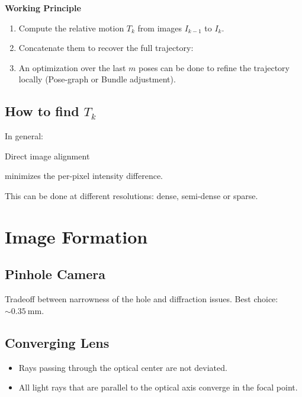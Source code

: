 \documentclass[10pt,a4paper]{scrartcl}
\begin{document}
\begin{multicols*}{2}
\textbf{Working Principle}

\begin{enumerate}
\item Compute the relative motion $T_k$ from images $I_{k-1}$ to $I_k$.
\item Concatenate them to recover the full trajectory:

\item An optimization over the last $m$ poses can be done to refine the trajectory locally (Pose-graph or Bundle adjustment).
\end{enumerate}

\subsection{How to find $T_k$}

In general:


Direct image alignment


minimizes the per-pixel intensity difference.

This can be done at different resolutions: dense, semi-dense or sparse.

\section{Image Formation}

\subsection{Pinhole Camera}

Tradeoff between narrowness of the hole and diffraction issues. Best choice: $\sim \SI{0.35}{\milli\meter}$.

\subsection{Converging Lens}

\begin{itemize}
\item Rays passing through the optical center are not deviated.
\item All light rays that are parallel to the optical axis converge in the focal point.
\end{itemize}


\end{multicols*}
\end{document}
